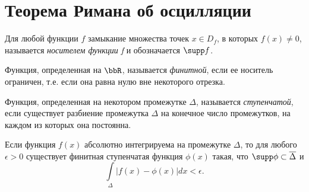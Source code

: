 \section{Теорема Римана об осцилляции}
\begin{defn}
Для любой функции $f$ замыкание множества точек $x \in D_{f}$, в которых $f(x) \neq 0$, называется \textit{носителем функции f} и обозначается $\supp f$.
\end{defn}
\begin{defn}
Функция, определенная на $\bbR$, называется \textit{финитной}, если ее носитель ограничен, т.е. если она равна нулю вне некоторого отрезка.
\end{defn}
\begin{defn}
Функция, определенная на некотором промежутке $\Delta$, называется \textit{ступенчатой}, если существует разбиение промежутка $\Delta$ на конечное число промежутков, на каждом из которых она постоянна.
\end{defn}
\begin{thm} \label{ch17thm1}
Если функция $f(x)$ абсолютно интегрируема на промежутке $\Delta$, то для любого $\epsilon > 0$ существует финитная ступенчатая функция $\phi(x)$ такая, что $\supp\phi \subset \overline{\Delta}$ и
\begin{equation} \label{ch17eq7}
\int\limits_{\Delta} |f(x) - \phi(x)|dx < \epsilon.
\end{equation}
\end{thm}
